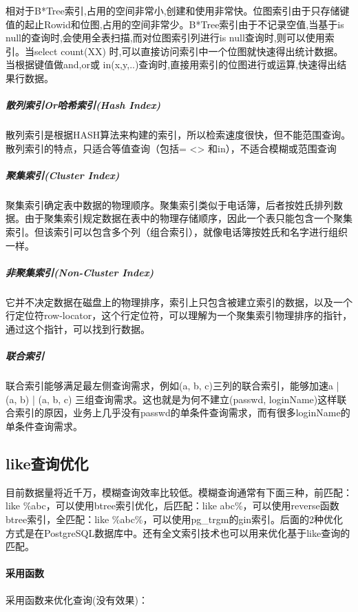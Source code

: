 \documentclass[letter]{book}
\begin{document}
相对于B*Tree索引,占用的空间非常小,创建和使用非常快。位图索引由于只存储键值的起止Rowid和位图,占用的空间非常少。B*Tree索引由于不记录空值,当基于is null的查询时,会使用全表扫描,而对位图索引列进行is null查询时,则可以使用索引。当select count(XX) 时,可以直接访问索引中一个位图就快速得出统计数据。当根据键值做and,or或 in(x,y,..)查询时,直接用索引的位图进行或运算,快速得出结果行数据。

\subparagraph{散列索引Or哈希索引(Hash Index)}

散列索引是根据HASH算法来构建的索引，所以检索速度很快，但不能范围查询。散列索引的特点，只适合等值查询（包括= <> 和in），不适合模糊或范围查询

\subparagraph{聚集索引(Cluster Index)}

聚集索引确定表中数据的物理顺序。聚集索引类似于电话簿，后者按姓氏排列数据。由于聚集索引规定数据在表中的物理存储顺序，因此一个表只能包含一个聚集索引。但该索引可以包含多个列（组合索引），就像电话簿按姓氏和名字进行组织一样。 

\subparagraph{非聚集索引(Non-Cluster Index)}

它并不决定数据在磁盘上的物理排序，索引上只包含被建立索引的数据，以及一个行定位符row-locator，这个行定位符，可以理解为一个聚集索引物理排序的指针，通过这个指针，可以找到行数据。

\subparagraph{联合索引}

联合索引能够满足最左侧查询需求，例如(a, b, c)三列的联合索引，能够加速a | (a, b) | (a, b, c) 三组查询需求。这也就是为何不建立(passwd, loginName)这样联合索引的原因，业务上几乎没有passwd的单条件查询需求，而有很多loginName的单条件查询需求。

\subsection{like查询优化}

目前数据量将近千万，模糊查询效率比较低。模糊查询通常有下面三种，前匹配：like \%abc，可以使用btree索引优化，后匹配：like abc\%，可以使用reverse函数btree索引，全匹配：like \%abc\%，可以使用pg\_trgm的gin索引。后面的2种优化方式是在PostgreSQL数据库中。还有全文索引技术也可以用来优化基于like查询的匹配。

\paragraph{采用函数}

采用函数来优化查询(没有效果)：
\end{document}
